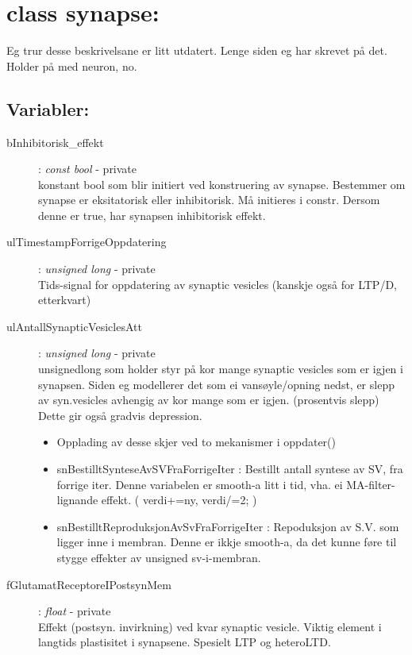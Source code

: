 \documentclass[norsk,11 pt]{report}
\begin{document}
\pagebreak






\chapter{class synapse:}

	Eg trur desse beskrivelsane er litt utdatert. Lenge siden eg har skrevet på det. Holder på med neuron, no.


	\section{Variabler:}
		\begin{description}
			\item[bInhibitorisk\_effekt] 	 		: 	\textit{const bool} 	- 	private \\
		konstant bool som blir initiert ved konstruering av synapse. Bestemmer om synapse er eksitatorisk eller inhibitorisk. Må initieres i constr.
		Dersom denne er true, har synapsen inhibitorisk effekt.
		\item[ulTimestampForrigeOppdatering] 		: 	\textit{unsigned long}  - 	private \\
		Tids-signal for oppdatering av synaptic vesicles (kanskje også for LTP/D, etterkvart)
		
		\item[ulAntallSynapticVesiclesAtt] 			: 	\textit{unsigned long} 	- 	private \\
	        unsignedlong som holder styr på kor mange synaptic vesicles som er igjen i synapsen. Siden eg modellerer det som ei vansøyle/opning nedst,
		er slepp av syn.vesicles avhengig av kor mange som er igjen. (prosentvis slepp) Dette gir også gradvis depression.
 			\begin{itemize}
				\item Opplading av desse skjer ved to mekanismer i oppdater()
				\item snBestilltSynteseAvSVFraForrigeIter : Bestillt antall syntese av SV, fra forrige iter. Denne variabelen er smooth-a litt
				    i tid, vha. ei MA-filter-lignande effekt. ( verdi+=ny, verdi/=2; )
			 	\item snBestilltReproduksjonAvSvFraForrigeIter : Repoduksjon av S.V. som ligger inne i membran. Denne er ikkje smooth-a, da det 
			       	    kunne føre til stygge effekter av unsigned sv-i-membran.
			\end{itemize}    

		\item[fGlutamatReceptoreIPostsynMem] 		: 	\textit{float} 		- 	private \\
		Effekt (postsyn. invirkning) ved kvar synaptic vesicle. Viktig element i langtids plastisitet i synapsene. Spesielt LTP og heteroLTD.


\end{description}
\end{document}
